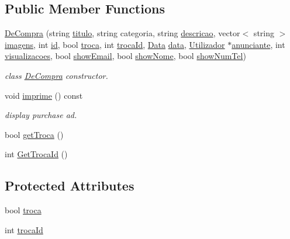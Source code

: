 \subsection*{Public Member Functions}
\begin{DoxyCompactItemize}
\item 
\hyperlink{class_de_compra_ad83de3818a7e878826e61e920d537252}{De\+Compra} (string \hyperlink{class_anuncio_adb34bedd8220f42b9ee37662c21313e6}{titulo}, string categoria, string \hyperlink{class_anuncio_aa6a9eb8d08cb06d16061b006eb2c8b97}{descricao}, vector$<$ string $>$ \hyperlink{class_anuncio_a9ff3646a44a2e285d082682e37631ac7}{imagens}, int \hyperlink{class_anuncio_a42900203e39da639a1128277dbd96baf}{id}, bool \hyperlink{class_de_compra_a708ee7e2f74c736428d5c9c7308ee300}{troca}, int \hyperlink{class_de_compra_a280cfa44a43c68e29b446bef1a10e9d7}{troca\+Id}, \hyperlink{class_data}{Data} \hyperlink{class_anuncio_a2c35b71b56332894a705eb2770d5102b}{data}, \hyperlink{class_utilizador}{Utilizador} $\ast$\hyperlink{class_anuncio_ac89450835a3cd86dac14bda6dfd83934}{anunciante}, int \hyperlink{class_anuncio_ae3fb8cd61ec06485ee166cd3b5d80804}{visualizacoes}, bool \hyperlink{class_anuncio_a6a41218c0a11ba393522d3a9a80ded95}{show\+Email}, bool \hyperlink{class_anuncio_a50feea41d2253cd5168243b18fa03aa6}{show\+Nome}, bool \hyperlink{class_anuncio_a8db5dc7339e63974c643a6602f2cf7bc}{show\+Num\+Tel})
\begin{DoxyCompactList}\small\item\em class \hyperlink{class_de_compra}{De\+Compra} constructor. \end{DoxyCompactList}\item 
void \hyperlink{class_de_compra_aaa396bd58e71806e4d3ff66243cb57ba}{imprime} () const 
\begin{DoxyCompactList}\small\item\em display purchase ad. \end{DoxyCompactList}\item 
bool \hyperlink{class_de_compra_acbf735506b85b8b121cdeaaecd639be2}{get\+Troca} ()
\item 
int \hyperlink{class_de_compra_a788fd25fac80072adc70e644cdce0fc9}{Get\+Troca\+Id} ()
\end{DoxyCompactItemize}
\subsection*{Protected Attributes}
\begin{DoxyCompactItemize}
\item 
bool \hyperlink{class_de_compra_a708ee7e2f74c736428d5c9c7308ee300}{troca}
\item 
int \hyperlink{class_de_compra_a280cfa44a43c68e29b446bef1a10e9d7}{troca\+Id}
\end{DoxyCompactItemize}
